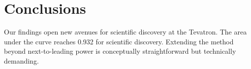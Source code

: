 \section{Conclusions}\label{sec:conclusions}

Our findings open new avenues for scientific discovery at the Tevatron.
The area under the curve reaches 0.932 for scientific discovery.
Extending the method beyond next-to-leading power is conceptually
straightforward but technically demanding.

